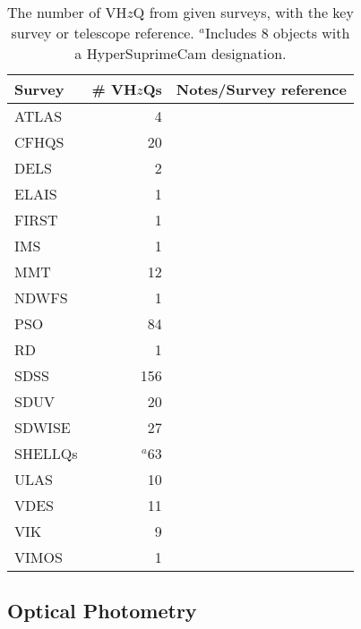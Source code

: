 \documentclass[usenatbib]{mnras}
\begin{document}
\begin{table}
\begin{tabular}{l r l}
\hline  \hline
Survey   & \# VH$z$Qs & Notes/Survey reference  \\
\hline  
  ATLAS      &     4    &  \citet{Shanks2015} \\
  CFHQS     &   20    &  \citet{Willott2007} \\
  DELS        &     2    &  \citet{Dey2018} \\
  ELAIS       &     1    &  \citet{Vaisanen2000} \\
  FIRST       &     1    &  \citet{Becker1995} \\
  IMS          &     1     &  \citet{Kim2015} \\
  MMT        &   12    &  \citet{McGreer2013} \\
  NDWFS    &     1     &  \citet{JD1999} \\
  PSO          &   84    &   \citet{Kaiser2002, Kaiser2010} \\
  RD           &     1       &  \cite{Mahabal2005} \\
  SDSS        & 156       & \citet{EDR} \\
  SDUV       &   20       & \citet{Yang2017} \\
  SDWISE    &   27    &     \citet{Wang2016} \\
  SHELLQs  &  $^{a}$63   &  \citet{Matsuoka2016}\\  %
  ULAS       &   10   & \citet{Lawrence2007} \\
  VDES       &   11   &  \citet{Reed2017} \\
  VIK          &     9   &  \citet{Edge2013} \\
  VIMOS     &     1   &  \citet{LeFevre2003} \\
\hline  \hline
\end{tabular}
\caption{The number of VH$z$Q from given surveys, with the key survey or telescope reference. 
$^{a}$Includes 8 objects with a HyperSuprimeCam \citep[HSC; ][]{Miyazaki2018}  
designation.
}
      \label{tab:surveys}
\end{table}

        
\subsection{Optical Photometry}
\end{document}
